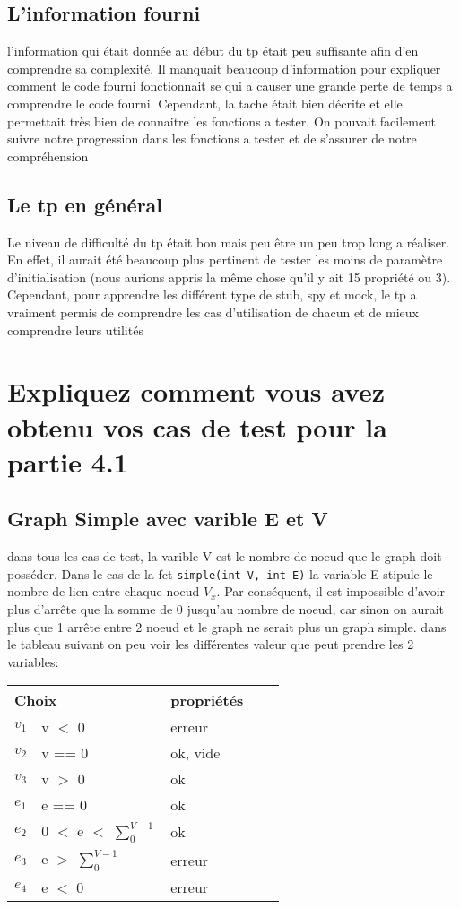 \documentclass[11pt]{article}
\begin{document}
\subsection{L'information fourni}
l'information qui était donnée au début du tp était peu suffisante afin d'en comprendre sa complexité.
Il manquait beaucoup d'information pour expliquer comment le code fourni fonctionnait se qui a causer une grande perte de temps a comprendre le code fourni.
Cependant, la tache était bien décrite et elle permettait très bien de connaitre les fonctions a tester.
On pouvait facilement suivre notre progression dans les fonctions a tester et de s'assurer de notre compréhension
\subsection{Le tp en général}
Le niveau de difficulté du tp était bon mais peu être un peu trop long a réaliser.
En effet, il aurait été beaucoup plus pertinent de tester les moins de paramètre d'initialisation (nous aurions appris la même chose qu'il y ait 15 propriété ou 3).
Cependant, pour apprendre les différent type de stub, spy et mock, le tp a vraiment permis de comprendre les cas d'utilisation de chacun et de mieux comprendre leurs utilités
\section{Expliquez comment vous avez obtenu vos cas de test pour la partie 4.1}
\subsection{Graph Simple avec varible E et V}
dans tous les cas de test, la varible V est le nombre de noeud que le graph doit posséder.
Dans le cas de la fct \verb|simple(int V, int E)| la variable E stipule le nombre de lien entre chaque noeud $V_x$.
Par conséquent, il est impossible d'avoir plus d'arrête que la somme de 0 jusqu'au nombre de noeud, car sinon on aurait plus que 1 arrête entre 2 noeud et le graph ne serait plus un graph simple.
dans le tableau suivant on peu voir les différentes valeur que peut prendre les 2 variables:
\begin{tabular}{|l|l|l|l|l|}
 \hline
 \multicolumn{2}{|l|}{Choix} & propriétés                              \\ \hline
 $v_1$                       & v $<$ 0                      & erreur   \\ \hline
 $v_2$                       & v == 0                       & ok, vide \\ \hline
 $v_3$                       & v $>$ 0                      & ok       \\ \hline \hline
 $e_1$                       & e == 0                       & ok       \\ \hline
 $e_2$                       & 0 $<$ e $<$ $\sum_{0}^{V-1}$ & ok       \\ \hline
 $e_3$                       & e $>$ $\sum_{0}^{V-1}$       & erreur   \\ \hline
 $e_4$                       & e $<$ 0                      & erreur   \\ \hline
\end{tabular}
\end{document}
